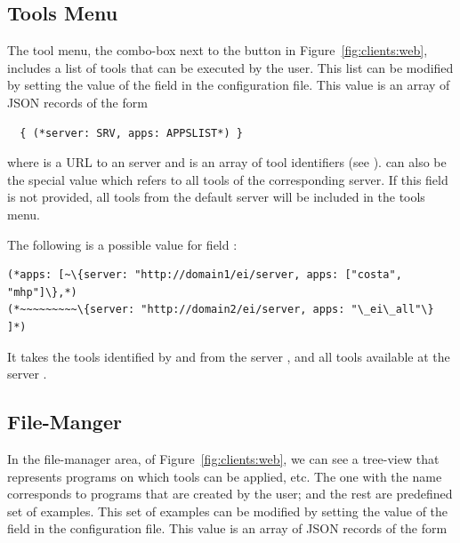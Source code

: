 \subsection{Tools  Menu}
\label{sec:clients:web:toolsmenu}

The tool menu, the combo-box next to the \applybutton button in
Figure~\ref{fig:clients:web}, includes a list of tools that can be
executed by the user. This list can be modified by setting the value
of the field  in the configuration file. This value
is an array of JSON records of the form

\bigskip
\begin{lstlisting}
  { (*server: SRV, apps: APPSLIST*) }
\end{lstlisting}
 
\bigskip
\noindent  
where  is a URL to an \ei server and  is an
array of tool identifiers (see ).
%
 can also be the special value  which
refers to all tools of the corresponding server.
%
If this field is not provided, all tools from the default server will
be included in the tools menu.

\begin{example}
  The following is a possible value for field :

\medskip
\begin{lstlisting}
(*apps: [~\{server: "http://domain1/ei/server, apps: ["costa", "mhp"]\},*)
(*~~~~~~~~~\{server: "http://domain2/ei/server, apps: "\_ei\_all"\} ]*)
\end{lstlisting}

\medskip
\noindent
It takes the tools identified by  and  from the
\ei server , and all tools available at
the \ei server .

\end{example}

\subsection{File-Manger}
\label{sec:clients:web:filemanager}

In the file-manager area, of Figure~\ref{fig:clients:web}, we can see
a tree-view that represents programs on which tools can be applied,
etc. 
%
The one with the name  corresponds to programs
that are created by the user; and the rest are predefined set of
examples. 
%
This set of examples can be modified by setting the value of the field
 in the configuration file. This value is an
array of JSON records of the form

